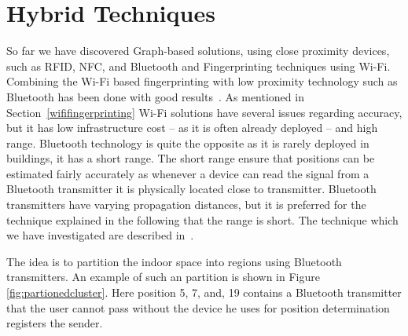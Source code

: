 \section{Hybrid Techniques}
So far we have discovered Graph-based solutions, using close proximity devices, such as RFID, NFC, and Bluetooth and Fingerprinting techniques using Wi-Fi. 
Combining the Wi-Fi based fingerprinting with low proximity technology such as Bluetooth has been done with good results~\cite{6068444}.
As mentioned in Section~\ref{wififingerprinting} Wi-Fi solutions have several issues regarding accuracy, but it has low infrastructure cost -- as it is often already deployed -- and high range. 
Bluetooth technology is quite the opposite as it is rarely deployed in buildings, it has a short range. 
The short range ensure that positions can be estimated fairly accurately as whenever a device can read the signal from a Bluetooth transmitter it is physically located close to transmitter. 
Bluetooth transmitters have varying propagation distances, but it is preferred for the technique explained in the following that the range is short. 
The technique which we have investigated are described in~\cite{6068444}.

The idea is to partition the indoor space into regions using Bluetooth transmitters.
An example of such an partition is shown in Figure \ref{fig:partionedcluster}. 
Here position 5, 7, and, 19 contains a Bluetooth transmitter that the user cannot pass without the device he uses for position determination registers the sender.  

